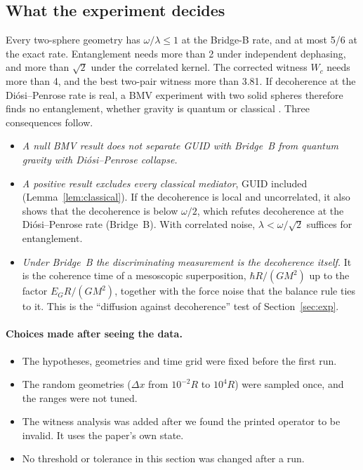 \subsection{What the experiment decides}\label{ss:bmv-decides}

Every two-sphere geometry has $\omega/\lambda\le1$ at the Bridge-B rate, and at most 5/6 at the exact rate. Entanglement needs more than 2
under independent dephasing, and more than $\sqrt2$ under the correlated kernel. The corrected witness $W_c$ needs more than 4, and the best
two-pair witness more than 3.81. If decoherence at the Di\'osi--Penrose rate is real, a BMV experiment with two solid spheres therefore finds
no entanglement, whether gravity is quantum or classical \tagS. Three consequences follow.
\begin{itemize}[nosep]
\item \emph{A null BMV result does not separate GUID with Bridge~B from quantum gravity with Di\'osi--Penrose collapse.}
\item \emph{A positive result excludes every classical mediator}, GUID included (Lemma~\ref{lem:classical}). If the decoherence is local and
uncorrelated, it also shows that the decoherence is below $\omega/2$, which refutes decoherence at the Di\'osi--Penrose rate (Bridge~B). With
correlated noise, $\lambda<\omega/\sqrt2$ suffices for entanglement.
\item \emph{Under Bridge~B the discriminating measurement is the decoherence itself.} It is the coherence time of a mesoscopic
superposition, $\hbar R/(GM^2)$ up to the factor $E_GR/(GM^2)$, together with the force noise that the balance rule ties to it. This is the
``diffusion against decoherence'' test of Section~\ref{sec:exp}.
\end{itemize}

\paragraph{Choices made after seeing the data.}
\begin{itemize}[nosep]
\item The hypotheses, geometries and time grid were fixed before the first run.
\item The random geometries ($\Delta x$ from $10^{-2}R$ to $10^4R$) were sampled once, and the ranges were not tuned.
\item The witness analysis was added after we found the printed operator to be invalid. It uses the paper's own state.
\item No threshold or tolerance in this section was changed after a run.
\end{itemize}

